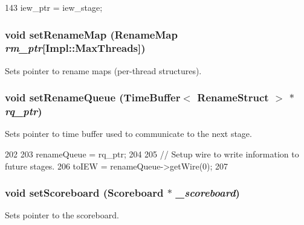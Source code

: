 \begin{DoxyCode}
143     { iew_ptr = iew_stage; }
\end{DoxyCode}
\hypertarget{classDefaultRename_a6f0aaedb2c39d674ef86c25d0aeb4211}{
\subsubsection[{setRenameMap}]{\setlength{\rightskip}{0pt plus 5cm}void setRenameMap ({\bf RenameMap} {\em rm\_\-ptr}\mbox{[}Impl::MaxThreads\mbox{]})}}
\label{classDefaultRename_a6f0aaedb2c39d674ef86c25d0aeb4211}
Sets pointer to rename maps (per-\/thread structures). \hypertarget{classDefaultRename_a701624f92a819fe4205faede6e614d9f}{
\subsubsection[{setRenameQueue}]{\setlength{\rightskip}{0pt plus 5cm}void setRenameQueue ({\bf TimeBuffer}$<$ {\bf RenameStruct} $>$ $\ast$ {\em rq\_\-ptr})}}
\label{classDefaultRename_a701624f92a819fe4205faede6e614d9f}
Sets pointer to time buffer used to communicate to the next stage. 


\begin{DoxyCode}
202 {
203     renameQueue = rq_ptr;
204 
205     // Setup wire to write information to future stages.
206     toIEW = renameQueue->getWire(0);
207 }
\end{DoxyCode}
\hypertarget{classDefaultRename_a0b50ac63f22501d5c688294031615b6e}{
\subsubsection[{setScoreboard}]{\setlength{\rightskip}{0pt plus 5cm}void setScoreboard ({\bf Scoreboard} $\ast$ {\em \_\-scoreboard})}}
\label{classDefaultRename_a0b50ac63f22501d5c688294031615b6e}
Sets pointer to the scoreboard. 


